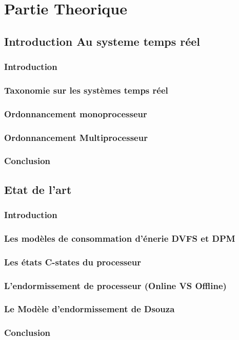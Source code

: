 \part{Partie Theorique}
\chapter{Introduction Au systeme temps réel}
\section{Introduction}
\section{Taxonomie sur les systèmes temps réel}
\section{Ordonnancement monoprocesseur}
\section{Ordonnancement Multiprocesseur}
\section{Conclusion}
\chapter{Etat de l'art}
\section{Introduction}
\section{Les modèles de consommation d'énerie DVFS et DPM}
\section{Les états C-states du processeur}
\section{L'endormissement de processeur (Online VS Offline)}
\section{Le Modèle d'endormissement de Dsouza}
\section{Conclusion}